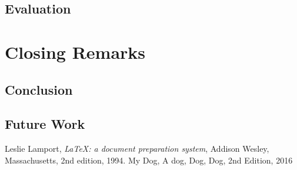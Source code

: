 \documentclass[authoryearcitations]{UoYCSproject}
\begin{document}
\chapter{Evaluation}
\label{cha:Evaluation}

\part{Closing Remarks}
\label{sec:close}
\chapter{Conclusion}
\label{cha:conclusion}
\chapter{Future Work}
\label{cha:futWork}

\begin{thebibliography}{56}

  Leslie Lamport,
  \emph{\LaTeX: a document preparation system},
  Addison Wesley, Massachusetts,
  2nd edition,
  1994.
	My Dog,
	A dog,
	Dog, Dog,
	2nd Edition,
	2016
\end{thebibliography}
\end{document}
